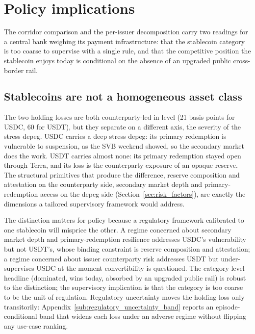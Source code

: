 \section{Policy implications}\label{sec:discussion}

The corridor comparison and the per-issuer decomposition carry two readings for a central bank weighing its payment infrastructure: that the stablecoin category is too coarse to supervise with a single rule, and that the competitive position the stablecoin enjoys today is conditional on the absence of an upgraded public cross-border rail.

\subsection{Stablecoins are not a homogeneous asset class}\label{sub:not_homogeneous}\label{sub:policy_implications}

The two holding losses are both counterparty-led in level (21 basis points for USDC, 60 for USDT), but they separate on a different axis, the severity of the stress depeg. USDC carries a deep stress depeg: its primary redemption is vulnerable to suspension, as the SVB weekend showed, so the secondary market does the work. USDT carries almost none: its primary redemption stayed open through Terra, and its loss is the counterparty exposure of an opaque reserve. The structural primitives that produce the difference, reserve composition and attestation on the counterparty side, secondary market depth and primary-redemption access on the depeg side (Section~\ref{sec:risk_factors}), are exactly the dimensions a tailored supervisory framework would address.

The distinction matters for policy because a regulatory framework calibrated to one stablecoin will misprice the other. A regime concerned about secondary market depth and primary-redemption resilience addresses USDC's vulnerability but not USDT's, whose binding constraint is reserve composition and attestation; a regime concerned about issuer counterparty risk addresses USDT but under-supervises USDC at the moment convertibility is questioned. The category-level headline (dominated, wins today, absorbed by an upgraded public rail) is robust to the distinction; the supervisory implication is that the category is too coarse to be the unit of regulation. Regulatory uncertainty moves the holding loss only transitorily: Appendix~\ref{sub:regulatory_uncertainty_band} reports an episode-conditional band that widens each loss under an adverse regime without flipping any use-case ranking.

